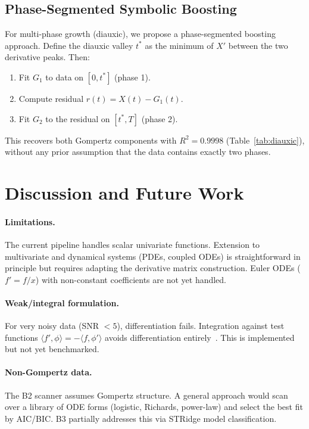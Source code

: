 \documentclass[11pt,a4paper]{article}
\begin{document}
\subsection{Phase-Segmented Symbolic Boosting}

For multi-phase growth (diauxic), we propose a phase-segmented boosting approach.
Define the diauxic valley $t^*$ as the minimum of $X'$ between the two derivative peaks.
Then:
\begin{enumerate}
  \item Fit $G_1$ to data on $[0, t^*]$ (phase 1).
  \item Compute residual $r(t) = X(t) - G_1(t)$.
  \item Fit $G_2$ to the residual on $[t^*, T]$ (phase 2).
\end{enumerate}
This recovers both Gompertz components with $R^2 = 0.9998$ (Table~\ref{tab:diauxic}),
without any prior assumption that the data contains exactly two phases.

\section{Discussion and Future Work}
\label{sec:future}

\paragraph{Limitations.}
The current pipeline handles scalar univariate functions. Extension to multivariate
and dynamical systems (PDEs, coupled ODEs) is straightforward in principle but requires
adapting the derivative matrix construction. Euler ODEs ($f' = f/x$) with non-constant
coefficients are not yet handled.

\paragraph{Weak/integral formulation.}
For very noisy data (SNR $< 5$), differentiation fails. Integration against test functions
$\langle f', \phi \rangle = -\langle f, \phi' \rangle$ avoids differentiation entirely~\cite{messenger2021}.
This is implemented but not yet benchmarked.

\paragraph{Non-Gompertz data.}
The B2 scanner assumes Gompertz structure. A general approach would scan over a library
of ODE forms (logistic, Richards, power-law) and select the best fit by AIC/BIC.
B3 partially addresses this via STRidge model classification.
\end{document}
